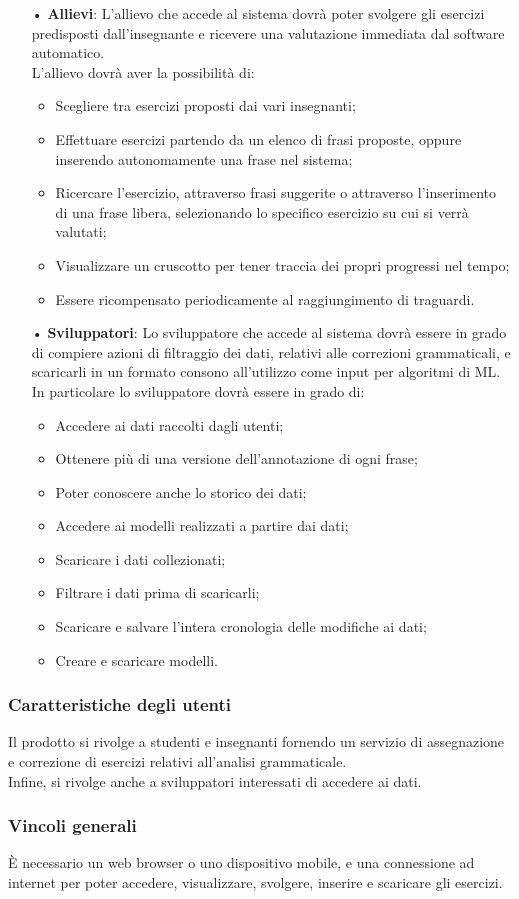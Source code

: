 \begin{itemize}
\item[•]\textbf{Allievi}:
L'allievo che accede al sistema dovrà poter svolgere gli esercizi predisposti dall'insegnante e ricevere una valutazione immediata dal software automatico.\\
L'allievo dovrà aver la possibilità di:
\begin{itemize}
\item Scegliere tra esercizi proposti dai vari insegnanti;
\item Effettuare esercizi partendo da un elenco di frasi proposte, oppure inserendo autonomamente una frase nel sistema;
\item Ricercare l'esercizio, attraverso frasi suggerite o attraverso l'inserimento di una frase libera, selezionando lo specifico esercizio su cui si verrà valutati; 
\item Visualizzare un {cruscotto} per tener traccia dei propri progressi nel tempo;
\item Essere ricompensato periodicamente al raggiungimento di traguardi.
\end{itemize}
\item[•]\textbf{Sviluppatori}:
Lo sviluppatore che accede al sistema dovrà essere in grado di compiere azioni di filtraggio dei dati, relativi alle correzioni grammaticali, e scaricarli in un formato consono all'utilizzo come input per algoritmi di {ML}. \\
In particolare lo sviluppatore dovrà essere in grado di:
\begin{itemize}
\item Accedere ai dati raccolti dagli utenti;
\item Ottenere più di una versione dell'annotazione di ogni frase;
\item Poter conoscere anche lo storico dei dati;
\item Accedere ai modelli realizzati a partire dai dati;
\item Scaricare i dati collezionati;
\item Filtrare i dati prima di scaricarli;
\item Scaricare e salvare l'intera cronologia delle modifiche ai dati;
\item Creare e scaricare modelli.
\end{itemize}
\end{itemize}
\subsubsection{Caratteristiche degli utenti}
Il prodotto si rivolge a studenti e insegnanti fornendo un servizio di assegnazione e correzione di esercizi relativi all'analisi grammaticale. \\ Infine, si rivolge anche a sviluppatori interessati di accedere ai dati.
\subsubsection{Vincoli generali}
\uppercase{è} necessario un web browser o uno dispositivo mobile, e una connessione ad internet per poter accedere, visualizzare, svolgere, inserire e scaricare gli esercizi.

